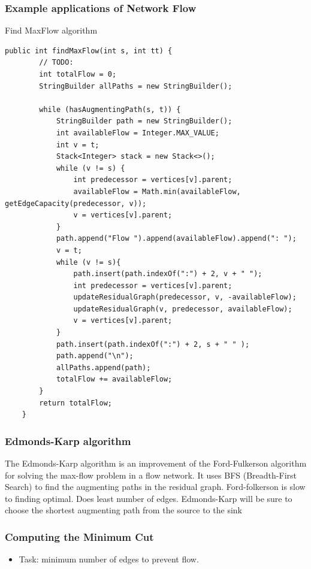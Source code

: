 \documentclass[10pt]{article}
\begin{document}
\subsubsection{Example applications of Network Flow}
Find MaxFlow algorithm
\begin{lstlisting}[style=java]
        public int findMaxFlow(int s, int tt) {
        // TODO:
        int totalFlow = 0;
        StringBuilder allPaths = new StringBuilder();

        while (hasAugmentingPath(s, t)) {
            StringBuilder path = new StringBuilder();
            int availableFlow = Integer.MAX_VALUE;
            int v = t;
            Stack<Integer> stack = new Stack<>();
            while (v != s) {
                int predecessor = vertices[v].parent;
                availableFlow = Math.min(availableFlow, getEdgeCapacity(predecessor, v));
                v = vertices[v].parent;
            }
            path.append("Flow ").append(availableFlow).append(": ");
            v = t;
            while (v != s){
                path.insert(path.indexOf(":") + 2, v + " ");
                int predecessor = vertices[v].parent;
                updateResidualGraph(predecessor, v, -availableFlow);
                updateResidualGraph(v, predecessor, availableFlow);
                v = vertices[v].parent;
            }
            path.insert(path.indexOf(":") + 2, s + " " );
            path.append("\n");
            allPaths.append(path);
            totalFlow += availableFlow;
        }
        return totalFlow;
    }
    \end{lstlisting}
\subsubsection{Edmonds-Karp algorithm}
The Edmonds-Karp algorithm is an improvement of the Ford-Fulkerson algorithm for solving the max-flow problem in a flow network. It uses BFS (Breadth-First Search) to find the augmenting paths in the residual graph.
Ford-folkerson is slow to finding optimal. Does least number of edges.
Edmonds-Karp will be sure to choose the shortest augmenting path from the source to the sink
\subsubsection{Computing the Minimum Cut}
\begin{itemize}
    \item Task: minimum number of edges to prevent flow.
\end{itemize}
\end{document}
